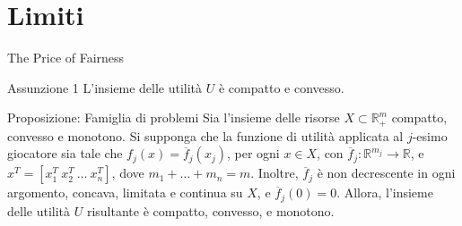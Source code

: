 \documentclass{beamer}
\begin{document}

\section{Limiti}

\begin{frame}{The Price of Fairness}
	\begin{block}{Assunzione 1} \label{A1}
		L'insieme delle utilità $U$ è compatto e convesso.
	\end{block}
\begin{exampleblock}{Proposizione: Famiglia di problemi}
	Sia l'insieme delle risorse $X \subset \mathbb{R}^m_+$ compatto, convesso e monotono. Si supponga che la funzione di utilità applicata al $j$-esimo giocatore sia tale che $f_j(x) = \overline{f}_j(x_j)$, per ogni $x \in X$, con $\overline{f}_j: \mathbb{R}^{m_j} \rightarrow \mathbb{R}$, e $x^T = [x_1^T \ x_2^T \ \dots \ x_n^T]$, dove $m_1+\dots+m_n=m$. Inoltre, $\overline{f}_j$ è non decrescente in ogni argomento, concava, limitata e continua su $X$, e $\overline{f}_j(0)=0$. Allora, l'insieme delle utilità $U$ risultante è compatto, convesso, e monotono.
\end{exampleblock}
\end{frame}
\end{document}
